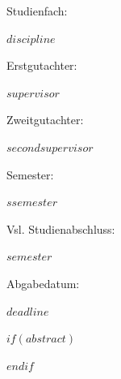 \documentclass[$if(fontsize)$$fontsize$,$endif$$if(lang)$$lang$,$endif$$if(papersize)$$papersize$,$endif$$for(classoption)$$classoption$$sep$,$endfor$]{$documentclass$}
\begin{document}
\begin{titlepage}
  \noindent\begin{minipage}[t]{0.3\textwidth}
  Studienfach:
  \end{minipage}
  \begin{minipage}[t]{0.7\textwidth}
  \hspace{1cm}$discipline$
  \end{minipage}   
 
  \noindent\begin{minipage}[t]{0.3\textwidth}
  Erstgutachter:
  \end{minipage}
  \begin{minipage}[t]{0.7\textwidth}
  \hspace{1cm}$supervisor$
  \end{minipage}
  
  \noindent\begin{minipage}[t]{0.3\textwidth}
  Zweitgutachter:
  \end{minipage}
  \begin{minipage}[t]{0.7\textwidth}
  \hspace{1cm}$secondsupervisor$
  \end{minipage} 
  
  \noindent\begin{minipage}[t]{0.3\textwidth}
  Semester:
  \end{minipage}
  \begin{minipage}[t]{0.7\textwidth}
  \hspace{1cm}$ssemester$
  \end{minipage} 
  
  \noindent\begin{minipage}[t]{0.3\textwidth}
  Vsl. Studienabschluss:
  \end{minipage}
  \begin{minipage}[t]{0.7\textwidth}
  \hspace{1cm}$semester$
  \end{minipage} 
  
  \noindent\begin{minipage}[t]{0.3\textwidth}
  Abgabedatum:
  \end{minipage}
  \begin{minipage}[t]{0.7\textwidth}
  \hspace{1cm}$deadline$
  \end{minipage}
     
\end{titlepage}

$if(abstract)$
\begin{abstract}
$abstract$
\end{abstract}
$endif$
\end{document}
